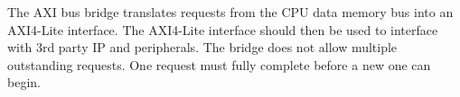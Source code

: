 
The AXI bus bridge translates requests from the CPU data memory
bus into an AXI4-Lite interface.
The AXI4-Lite interface should then be used to interface with 3rd party
IP and peripherals.
The bridge does not allow multiple outstanding requests.
One request must fully complete before a new one can begin.

